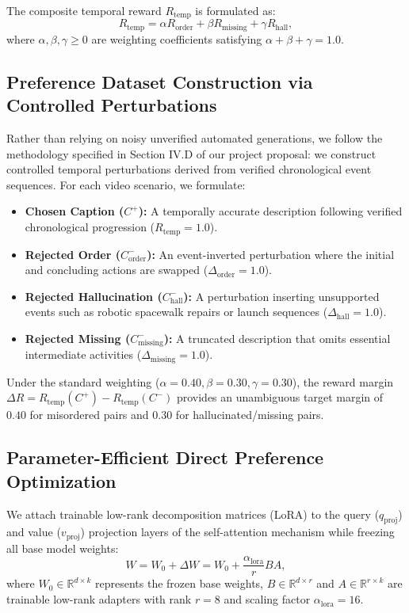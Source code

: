 \documentclass[journal]{IEEEtai}
\begin{document}
The composite temporal reward $R_{\text{temp}}$ is formulated as:
\begin{equation}
R_{\text{temp}} = \alpha R_{\text{order}} + \beta R_{\text{missing}} + \gamma R_{\text{hall}},
\label{eq:reward}
\end{equation}
where $\alpha, \beta, \gamma \ge 0$ are weighting coefficients satisfying $\alpha + \beta + \gamma = 1.0$.

\subsection{Preference Dataset Construction via Controlled Perturbations}
Rather than relying on noisy unverified automated generations, we follow the methodology specified in Section IV.D of our project proposal: we construct controlled temporal perturbations derived from verified chronological event sequences. For each video scenario, we formulate:
\begin{itemize}
    \item \textbf{Chosen Caption ($C^+$):} A temporally accurate description following verified chronological progression ($R_{\text{temp}} = 1.0$).
    \item \textbf{Rejected Order ($C^-_{\text{order}}$):} An event-inverted perturbation where the initial and concluding actions are swapped ($\Delta_{\text{order}} = 1.0$).
    \item \textbf{Rejected Hallucination ($C^-_{\text{hall}}$):} A perturbation inserting unsupported events such as robotic spacewalk repairs or launch sequences ($\Delta_{\text{hall}} = 1.0$).
    \item \textbf{Rejected Missing ($C^-_{\text{missing}}$):} A truncated description that omits essential intermediate activities ($\Delta_{\text{missing}} = 1.0$).
\end{itemize}

Under the standard weighting ($\alpha=0.40, \beta=0.30, \gamma=0.30$), the reward margin $\Delta R = R_{\text{temp}}(C^+) - R_{\text{temp}}(C^-)$ provides an unambiguous target margin of $0.40$ for misordered pairs and $0.30$ for hallucinated/missing pairs.

\subsection{Parameter-Efficient Direct Preference Optimization}
We attach trainable low-rank decomposition matrices (LoRA) to the query ($q_{\text{proj}}$) and value ($v_{\text{proj}}$) projection layers of the self-attention mechanism while freezing all base model weights:
\begin{equation}
W = W_0 + \Delta W = W_0 + \frac{\alpha_{\text{lora}}}{r} B A,
\label{eq:lora}
\end{equation}
where $W_0 \in \mathbb{R}^{d \times k}$ represents the frozen base weights, $B \in \mathbb{R}^{d \times r}$ and $A \in \mathbb{R}^{r \times k}$ are trainable low-rank adapters with rank $r=8$ and scaling factor $\alpha_{\text{lora}}=16$.
\end{document}
